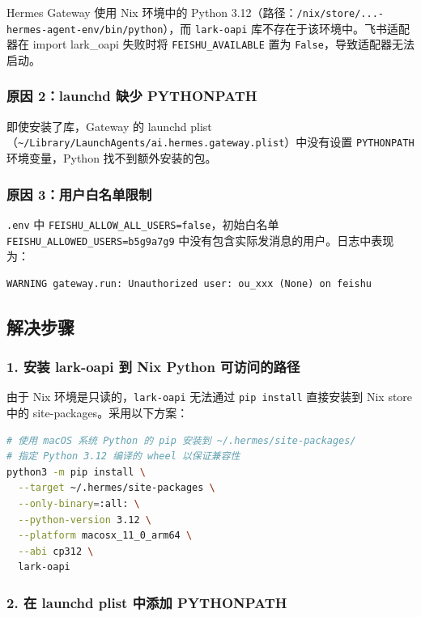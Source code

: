 Hermes Gateway 使用 Nix 环境中的 Python 3.12（路径：\texttt{/nix/store/...-hermes-agent-env/bin/python}），而 \texttt{lark-oapi} 库不存在于该环境中。飞书适配器在 import lark\_oapi 失败时将 \texttt{FEISHU\_AVAILABLE} 置为 \texttt{False}，导致适配器无法启动。

\subsubsection{原因 2：launchd 缺少 PYTHONPATH}

即使安装了库，Gateway 的 launchd plist（\texttt{\textasciitilde/Library/LaunchAgents/ai.hermes.gateway.plist}）中没有设置 \texttt{PYTHONPATH} 环境变量，Python 找不到额外安装的包。

\subsubsection{原因 3：用户白名单限制}

\texttt{.env} 中 \texttt{FEISHU\_ALLOW\_ALL\_USERS=false}，初始白名单 \texttt{FEISHU\_ALLOWED\_USERS=b5g9a7g9} 中没有包含实际发消息的用户。日志中表现为：

\begin{lstlisting}
WARNING gateway.run: Unauthorized user: ou_xxx (None) on feishu
\end{lstlisting}

\subsection{解决步骤}

\subsubsection{1. 安装 lark-oapi 到 Nix Python 可访问的路径}

由于 Nix 环境是只读的，\texttt{lark-oapi} 无法通过 \texttt{pip install} 直接安装到 Nix store 中的 site-packages。采用以下方案：

\begin{lstlisting}[language=bash]
# 使用 macOS 系统 Python 的 pip 安装到 ~/.hermes/site-packages/
# 指定 Python 3.12 编译的 wheel 以保证兼容性
python3 -m pip install \
  --target ~/.hermes/site-packages \
  --only-binary=:all: \
  --python-version 3.12 \
  --platform macosx_11_0_arm64 \
  --abi cp312 \
  lark-oapi
\end{lstlisting}

\subsubsection{2. 在 launchd plist 中添加 PYTHONPATH}

